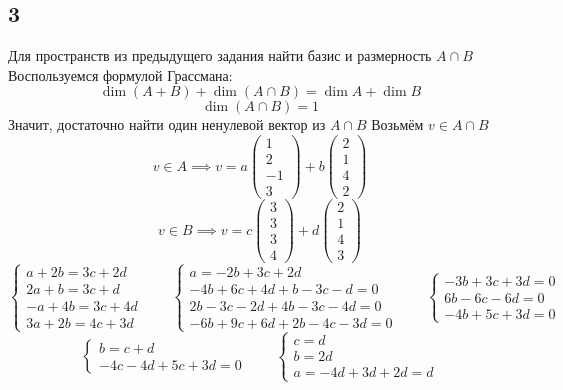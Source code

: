 \subsection{3}
Для пространств из предыдущего задания найти базис и размерность $ A \cap B $ \\
Воспользуемся формулой Грассмана:
$$ \dim (A + B) + \dim (A \cap B) = \dim A + \dim B $$
$$ \dim (A \cap B) = 1 $$
Значит, достаточно найти один ненулевой вектор из $ A \cap B $
Возьмём $ v \in A \cap B $
$$ v \in A \implies v = a
\begin{pmatrix}
	1 \\
    2 \\
    -1 \\
    3
\end{pmatrix} + b
\begin{pmatrix}
	2 \\
    1 \\
    4 \\
    2
\end{pmatrix} $$
$$ v \in B \implies v = c
\begin{pmatrix}
	3 \\
    3 \\
    3 \\
    4
\end{pmatrix} + d
\begin{pmatrix}
	2 \\
    1 \\
    4 \\
    3
\end{pmatrix} $$
$$
\begin{cases}
	a + 2b = 3c + 2d \\
    2a + b = 3c + d \\
    -a + 4b = 3c + 4d \\
    3a + 2b = 4c + 3d
\end{cases} \qquad
\begin{cases}
	a = -2b + 3c + 2d \\
    -4b + 6c + 4d + b - 3c - d = 0 \\
    2b - 3c - 2d + 4b - 3c - 4d = 0 \\
    -6b + 9c + 6d + 2b - 4c - 3d = 0
\end{cases} \qquad
\begin{cases}
	-3b + 3c + 3d = 0 \\
    6b - 6c - 6d = 0 \\
    -4b + 5c + 3d = 0
\end{cases} $$
$$
\begin{cases}
	b = c + d \\
    -4c - 4d + 5c + 3d = 0
\end{cases} \qquad
\begin{cases}
	c = d \\
    b = 2d \\
    a = -4d + 3d + 2d = d
\end{cases} $$
